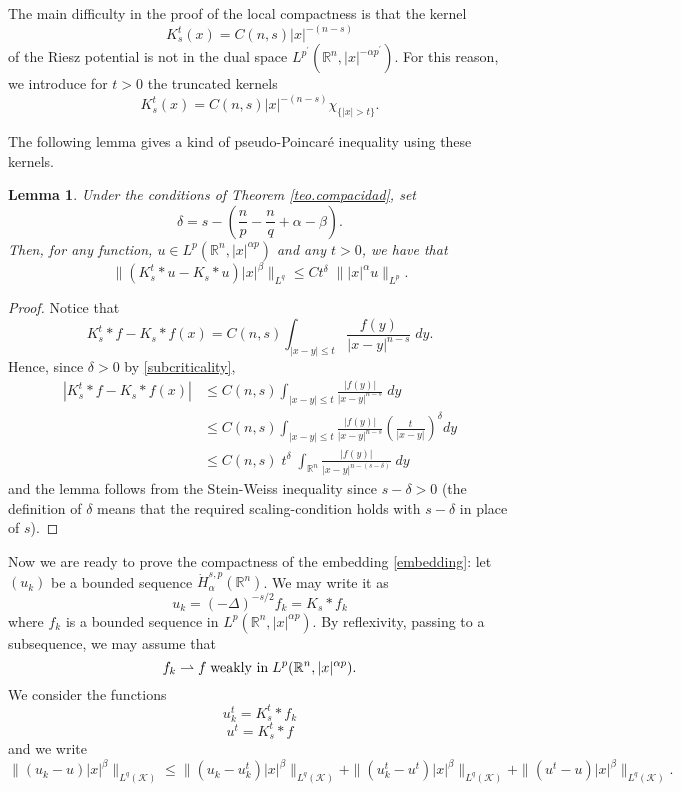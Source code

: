 \documentclass[12pt]{amsart}
\newcommand {\R}{\mathbb{R}}
\newtheorem{lemma}[theorem]{Lemma}
\begin{document}
\medskip

The main difficulty in the proof of the local compactness is that the kernel
$$ K_s^t(x) = C(n,s) |x|^{-(n-s)} $$
of the Riesz potential is not in the dual 
space $L^{p^\prime}(\R^n,|x|^{-\alpha p^\prime})$. For this reason, 
we introduce for $t>0$ the truncated kernels
$$ K_s^t(x) = C(n,s) |x|^{-(n-s)} \chi_{\{|x|>t\}}.
 $$

The following lemma gives a kind of pseudo-Poincaré 
inequality using these kernels.

\begin{lemma}
	Under the conditions of Theorem \ref{teo.compacidad}, set 
	$$\delta = s - \left( \frac{n}{p}-\frac{n}{q} + \alpha-\beta  \right).$$
	Then, for any function, $u \in L^p(\R^n,|x|^{\alpha p})$ and any $t>0$, we have that
	$$ \| (K_{s}^t * u - K_{s}* u) |x|^\beta \|_{L^q} \leq C t^{\delta} \; \| |x|^\alpha u \|_{L^p}.$$
\end{lemma}

\begin{proof}
	Notice that
	$$  K_{s}^t * f - K_{s}* f(x)= C(n,s) \int_{|x-y|\leq t} \frac{f(y)}{|x-y|^{n-s}} \; dy  .$$
	Hence, since $\delta>0$ by \eqref{subcriticality},
	\begin{align*}
	|K_{s}^t * f - K_{s}* f(x)| &\leq C(n,s) \int_{|x-y| \leq t} \frac{|f(y)|}{|x-y|^{n-s}} \; dy  \\
	&\leq C(n,s) \int_{|x-y|\leq t} \frac{|f(y)|}{|x-y|^{n-s}} 
	\left( \frac{t}{|x-y|} \right)^\delta dy \\
	&\leq C(n,s) \; t^\delta \; \int_{\R^n} \frac{|f(y)|}{|x-y|^{n-(s-\delta)}} \; dy 
	\end{align*}
	and the lemma follows from the Stein-Weiss inequality since $s-\delta>0$ (the definition of $\delta$ means 
	that the required scaling-condition holds with $s-\delta$ in place of $s$).
\end{proof}

\bigskip

Now we are ready to prove the compactness of the embedding \eqref{embedding}:
let $(u_k)$ be a bounded sequence $\dot H^{s,p}_\alpha(\R^n)$. We may write it as
$$ u_k = (-\Delta)^{-s/2} f_k = K_s * f_k $$
where $f_k$ is a bounded sequence in $L^p(\R^n,|x|^{\alpha p})$. By
reflexivity, passing to a subsequence, we may assume that 
$$ f_k \rightharpoonup f \; \hbox{weakly in} \; L^{p}(\R^n,|x|^{\alpha p}).$$ 
We consider the functions
$$ u_k^t = K_s^t *  f_k $$
$$ u^t = K_s^t *  f $$
and we write
$$ \| (u_k - u) |x|^\beta  \|_{L^q(\mathcal{K})} \leq
\| (u_k - u_k^t) |x|^\beta  \|_{L^q(\mathcal{K})} 
+ \| (u_k^t - u^t) |x|^\beta  \|_{L^q(\mathcal{K})}
+ \| (u^t -u) |x|^\beta  \|_{L^q(\mathcal{K})} . $$
\end{document}
